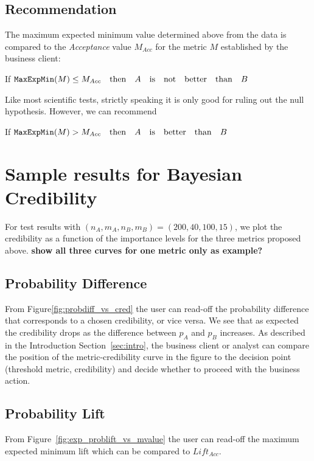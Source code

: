 \documentclass[letterpaper,12pt]{article}
\begin{document}
\subsection{Recommendation}
The maximum expected minimum value determined above from the data is
compared to the {\em Acceptance} value \(M_{Acc}\) for the metric \(M\)
established by the business client:
\begin{definition}
If \({\tt MaxExpMin}(M) \leq M_{Acc}\quad{\rm then}\quad A\quad{\rm
  is\quad not\quad better\quad than\quad}B\)
\end{definition}
Like most scientific tests, strictly speaking it is only good for
ruling out the null hypothesis. However, we can recommend
\begin{definition}
If \({\tt MaxExpMin}(M) > M_{Acc}\quad{\rm then}\quad A\quad{\rm
  is\quad better\quad than\quad}B\)
\end{definition}

\section{Sample results for Bayesian Credibility}
\label{sec:results}
For test results with \((n_A, m_A, n_B, m_B) = (200, 40, 100, 15)\), we plot
the credibility as a function of the importance levels for the three metrics
proposed above. {\bf show all three curves for one metric only as example?}

\subsection{Probability Difference}
From Figure\ref{fig:probdiff_vs_cred} the user can read-off the
probability difference that corresponds to a chosen credibility, or
vice versa. We see that as expected the credibility drops as the
difference between \(p_A\) and \(p_B\) increases. As described in the
Introduction Section~\ref{sec:intro}, the business client or analyst
can compare the position of the metric-credibility curve in the figure
to the decision point (threshold metric, credibility) and decide
whether to proceed with the business action.

\subsection{Probability Lift}
From Figure~\ref{fig:exp_problift_vs_mvalue} the user can read-off the
maximum expected minimum lift which can be compared to \(Lift_{Acc}\).
\end{document}
